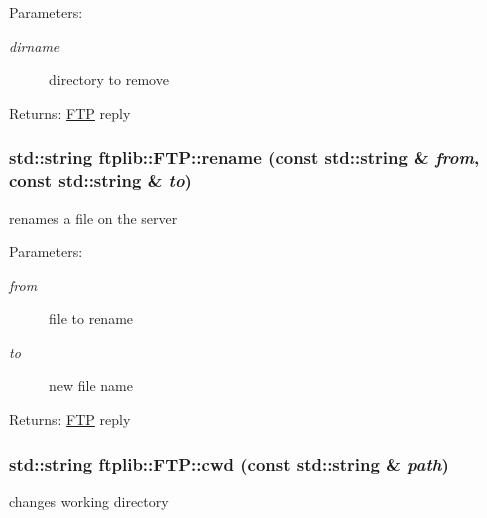 \begin{Desc}
\item[Parameters:]
\begin{description}
\item[{\em dirname}]directory to remove \end{description}
\end{Desc}
\begin{Desc}
\item[Returns:]\hyperlink{classftplib_1_1FTP}{FTP} reply \end{Desc}
\hypertarget{classftplib_1_1FTP_0adece922028464ff064da24b539798d}{
\subsubsection{\setlength{\rightskip}{0pt plus 5cm}std::string ftplib::FTP::rename (const std::string \& {\em from}, \/  const std::string \& {\em to})}}
\label{classftplib_1_1FTP_0adece922028464ff064da24b539798d}


renames a file on the server 

\begin{Desc}
\item[Parameters:]
\begin{description}
\item[{\em from}]file to rename \item[{\em to}]new file name \end{description}
\end{Desc}
\begin{Desc}
\item[Returns:]\hyperlink{classftplib_1_1FTP}{FTP} reply \end{Desc}
\hypertarget{classftplib_1_1FTP_7cd3c7fc71ae0c7dbdfcee88417d2685}{
\subsubsection{\setlength{\rightskip}{0pt plus 5cm}std::string ftplib::FTP::cwd (const std::string \& {\em path})}}
\label{classftplib_1_1FTP_7cd3c7fc71ae0c7dbdfcee88417d2685}


changes working directory 


